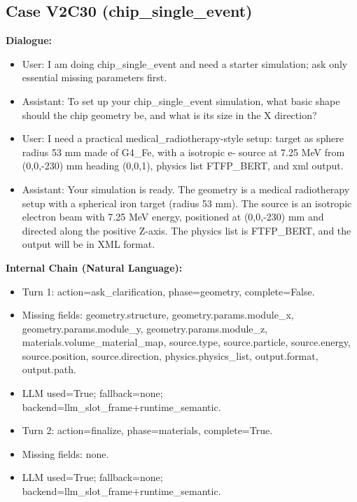 \documentclass[11pt]{ctexart}
\begin{document}
\subsection{Case V2C30 (chip\_single\_event)}
\textbf{Dialogue:}
\begin{itemize}
\item User: I am doing chip\_single\_event and need a starter simulation; ask only essential missing parameters first.
\item Assistant: To set up your chip\_single\_event simulation, what basic shape should the chip geometry be, and what is its size in the X direction?
\item User: I need a practical medical\_radiotherapy-style setup: target as sphere radius 53 mm made of G4\_Fe, with a isotropic e- source at 7.25 MeV from (0,0,-230) mm heading (0,0,1), physics list FTFP\_BERT, and xml output.
\item Assistant: Your simulation is ready. The geometry is a medical radiotherapy setup with a spherical iron target (radius 53 mm). The source is an isotropic electron beam with 7.25 MeV energy, positioned at (0,0,-230) mm and directed along the positive Z-axis. The physics list is FTFP\_BERT, and the output will be in XML format.
\end{itemize}
\textbf{Internal Chain (Natural Language):}
\begin{itemize}
\item Turn 1: action=ask\_clarification, phase=geometry, complete=False.
\item Missing fields: geometry.structure, geometry.params.module\_x, geometry.params.module\_y, geometry.params.module\_z, materials.volume\_material\_map, source.type, source.particle, source.energy, source.position, source.direction, physics.physics\_list, output.format, output.path.
\item LLM used=True; fallback=none; backend=llm\_slot\_frame+runtime\_semantic.
\item Turn 2: action=finalize, phase=materials, complete=True.
\item Missing fields: none.
\item LLM used=True; fallback=none; backend=llm\_slot\_frame+runtime\_semantic.
\end{itemize}
\end{document}
